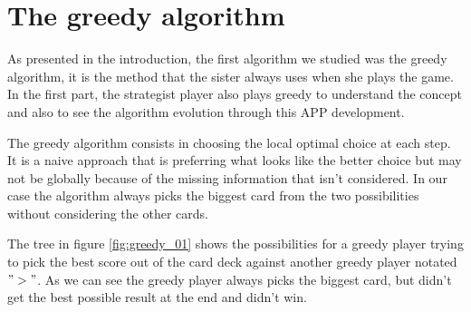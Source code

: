 \documentclass[a4paper,12pt,fleqn]{article}
\newcommand\ezskip{\medskip\noindent}
\begin{document}

\newpage

\section{The greedy algorithm} \label{sec:greedySol}
As presented in the introduction, the first algorithm we studied was the greedy algorithm, it is the method that the sister always uses when she plays the game. In the first part, the strategist player also plays greedy to understand the concept and also to see the algorithm evolution through this APP development.

\ezskip The greedy algorithm consists in choosing the local optimal choice at each step. It is a naive approach that is preferring what looks like the better choice but may not be globally because of the missing information that isn't considered. In our case the algorithm always picks the biggest card from the two possibilities without considering the other cards.

\ezskip The tree in figure \ref{fig:greedy_01} shows the possibilities for a greedy player trying to pick the best score out of the card deck against another greedy player notated $">"$. As we can see the greedy player always picks the biggest card, but didn't get the best possible result at the end and didn't win.
\end{document}
